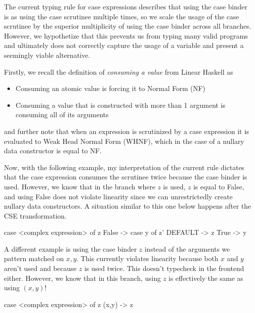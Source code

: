 \documentclass[]{lwnovathesis}
\begin{document}
The current typing rule for case expressions describes that using the case
binder is as using the case scrutinee multiple times, so we scale the usage of
the case scrutinee by the superior multiplicity of using the case binder across
all branches. However, we hypothetize that this prevents us from typing many
valid programs and ultimately does not correctly capture the usage of a
variable and present a seemingly viable alternative.

Firstly, we recall the definition of \emph{consuming a value} from Linear
Haskell as
\begin{itemize}
    \item Consuming an atomic value is forcing it to Normal Form (NF)
    \item Consuming a value that is constructed with more than 1 argument is
        consuming all of its arguments
\end{itemize}
and further note that when an expression is scrutinized by a case expression it
is evaluated to Weak Head Normal Form (WHNF), which in the case of a nullary data
constructor is equal to NF.

Now, with the following example, my interpretation of the current rule dictates
that the case expression consumes the scrutinee twice because the case binder is
used. However, we know that in the branch where $z$ is used, $z$ is equal to
False, and using False does not violate linearity since we can unrestrictedly
create nullary data constructors. A situation similar to this one below happens
after the CSE transformation.
\begin{code}
    case <complex expression> of z {
        False -> case y of z' { DEFAULT -> z }
        True  -> y
    }
\end{code}

A different example is using the case binder $z$ instead of the arguments we
pattern matched on $x,y$. This currently violates linearity because both $x$ and
$y$ aren't used and because $z$ is used twice. This doesn't typecheck in the
frontend either. However, we know that in this branch, using $z$ is effectively
the same as using $(x,y)$!
\begin{code}
    case <complex expression> of z {
        (x,y) -> z
    }
\end{code}
\end{document}
